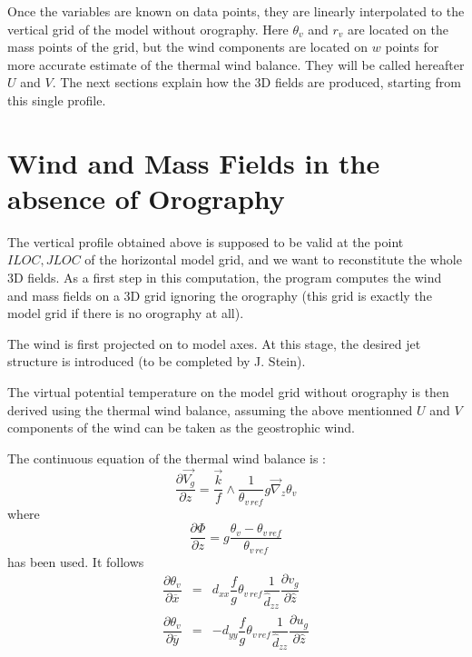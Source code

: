Once the variables are known on data points, they are linearly
interpolated to the vertical grid of the model without orography.
Here $\theta_v$ and $r_v$ are located on the mass points of the grid,
but the wind components are located on $w$ points for more accurate
estimate of the thermal wind balance. They will be called hereafter
$U$ and $V$.  The
next sections explain how the 3D fields are produced, starting from this
single profile.

\section{Wind and Mass Fields in the absence of Orography}

The vertical profile obtained above is supposed to be valid at the point
$ILOC,JLOC$ of the horizontal model grid, and we want to reconstitute the
whole 3D fields.  As a first step in this computation, the program computes
the wind and mass fields on a 3D grid ignoring the orography (this grid is
exactly the model grid if there is no orography at all).

The wind is first projected on to model axes. At this stage,
the desired jet structure is introduced (to be completed by J. Stein).

The virtual potential temperature on the model grid without
orography is then derived using the thermal wind balance, assuming the above
mentionned
$U$ and $V$ components of the wind can be taken as the geostrophic wind.

The continuous equation of the thermal wind balance is :
\begin{equation}
\dfrac{\partial \vec{V_{g}}}{\partial z} =
\dfrac{\vec{k}}{f} \wedge \dfrac{1}{\theta_{v\,ref}} g \vec{\nabla}_{z}
\theta_{v}
\end{equation}
where
\begin{equation}
\dfrac{\partial \Phi}{\partial z} = g \dfrac{ \theta_v - \theta_{v\,ref} }
{\theta_{v\,ref} }
\end{equation}
has been used. It follows
\begin{eqnarray}
\dfrac{\partial \theta_{v} }{\partial \overline{x}} & = &
d_{xx} \dfrac{f}{g}  \theta_{v\,ref}
\dfrac{1}{\widehat{d}_{zz}} \dfrac{\partial v_{g} }{\partial \widehat{z}}
\\
\dfrac{\partial \theta_{v} }{\partial \overline{y}} &  = & - d_{yy}
\dfrac{f}{g} \theta_{v\,ref}
\dfrac{1}{\widehat{d}_{zz}} \dfrac{\partial u_{g} }{\partial \widehat{z}}
\end{eqnarray}

